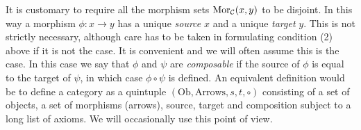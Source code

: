 \noindent
It is customary to require all the morphism sets
$\mathop{\mathrm{Mor}}\nolimits_\mathcal{C}(x, y)$ to be disjoint.
In this way a morphism $\phi : x \to y$ has a unique {\it source} $x$
and a unique {\it target} $y$. This is not strictly necessary,
although care has to be taken in formulating condition (2) above
if it is not the case. It is convenient and we will often assume
this is the case. In this case we say that $\phi$ and $\psi$ are
{\it composable} if the source of $\phi$ is equal to the
target of $\psi$, in which case $\phi \circ \psi$ is defined.
An equivalent definition would be to define a category
as a quintuple $(\text{Ob}, \text{Arrows}, s, t, \circ)$
consisting of a set of objects, a set of morphisms (arrows),
source, target and composition subject to a long list of axioms.
We will occasionally use this point of view.


